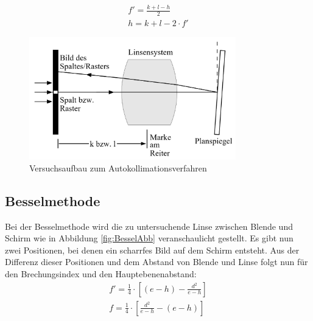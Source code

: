 \documentclass[11pt, a4paper]{article}
\begin{document}
    \begin{align}
    f' = \frac{k+l-h}{2} \label{eq:autokollBrech}\\
    h = k + l - 2 \cdot f' \label{eq:autokollHaupt}
    \end{align}

    \begin{figure}
        \centering
        \includegraphics[width=0.8\textwidth]{Autokollimation_abb.png}
        \caption{Versuchsaufbau zum Autokollimationsverfahren \cite{OPA}}   %
        \label{fig:autoKollAbb}
    \end{figure}

    \subsection{Besselmethode}
    Bei der Besselmethode wird die zu untersuchende Linse zwischen Blende und Schirm wie in Abbildung \ref{fig:BesselAbb} veranschaulicht gestellt.
    Es gibt nun zwei Positionen, bei denen ein scharrfes Bild auf dem Schirm entsteht. Aus der Differenz dieser Positionen und dem Abstand von Blende und Linse folgt nun für den Brechungsindex und den Hauptebenenabstand:
    \begin{align}
        f' = \frac{1}{4} \cdot [(e-h)-\frac{d^2}{e-h}] \label{eq:besselBrech1}\\
        f = \frac{1}{4} \cdot [\frac{d^2}{e-h}-(e-h)] \label{eq:besselBrech2}
    \end{align}
    
\end{document}

